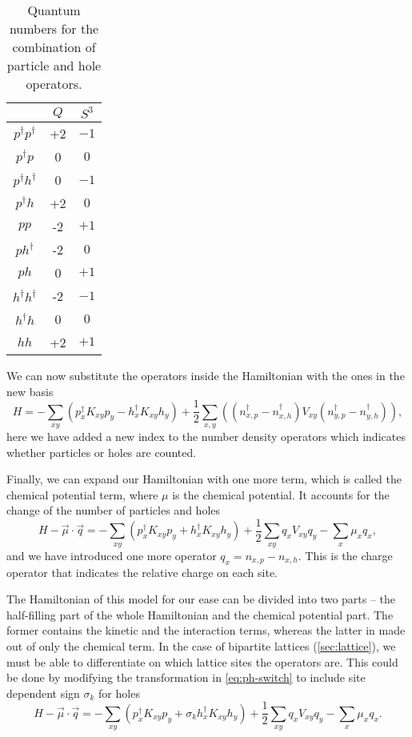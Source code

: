 \begin{table}[h]
    \centering
    \begin{tabular}{c|cc}
        & $Q$ & $S^3$ \\
    \hline
        $p^\dagger p^\dagger$ & +2 & $-1$ \\
        $p^\dagger p$ & 0 & $0$ \\
        $p^\dagger h^\dagger$ & 0 & $-1$ \\
        $p^\dagger h$ & +2 & $0$ \\
        $p p$ & -2 & $+1$ \\
        $p h^\dagger$ & -2 & $0$ \\
        $p h$ & 0 & $+1$ \\
        $h^\dagger h^\dagger$ & -2 & $-1$ \\
        $h^\dagger h$ & 0 & $0$ \\
        $h h$ & +2 & $+1$ \\
    \end{tabular}
    \caption{Quantum numbers for the combination of particle and hole operators.}
    \label{tab:ph-comb}
\end{table}

We can now substitute the operators inside the Hamiltonian with the ones in the new basis
\begin{equation}
    H = - \sum_{xy} \left( p^\dagger_x K_{xy} p_y - h^\dagger_x K_{xy} h_y \right) + \frac{1}{2} \sum_{x,y} \left( (n^\dagger_{x,p} - n^\dagger_{x,h}) V_{xy} (n^\dagger_{y,p} - n^\dagger_{y,h}) \right),
\end{equation}
here we have added a new index to the number density operators which indicates whether particles or holes are counted.

Finally, we can expand our Hamiltonian with one more term, which is called the chemical potential term, where $\mu$ is the chemical potential. It accounts for the change of the number of particles and holes
\begin{equation}
    H - \vec{\mu}\cdot\vec{q} = - \sum_{xy} \left( p^\dagger_x K_{xy} p_y + h^\dagger_x K_{xy} h_y \right) + \frac{1}{2}\sum_{xy} q_x V_{xy} q_y - \sum_{x} \mu_x q_x,
\end{equation}
and we have introduced one more operator $q_x = n_{x,p} - n_{x,h}$. This is the charge operator that indicates the relative charge on each site. 

The Hamiltonian of this model for our ease can be divided into two parts -- the half-filling part of the whole Hamiltonian and the chemical potential part. The former contains the kinetic and the interaction terms, whereas the latter in made out of only the chemical term. In the case of bipartite lattices (\cref{sec:lattice}), we must be able to differentiate on which lattice sites the operators are. This could be done by modifying the transformation in \cref{eq:ph-switch} to include site dependent sign $\sigma_k$ for holes
\begin{equation}
    H - \vec{\mu}\cdot\vec{q} = - \sum_{xy} \left( p^\dagger_x K_{xy} p_y + \sigma_k h^\dagger_x K_{xy} h_y \right) + \frac{1}{2}\sum_{xy} q_x V_{xy} q_y - \sum_{x} \mu_x q_x.
\end{equation}

